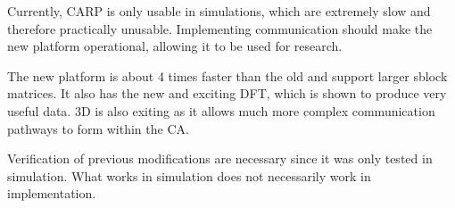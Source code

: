 
Currently, CARP is only usable in simulations, which are extremely slow and therefore practically unusable.
Implementing communication should make the new platform operational, allowing it to be used for research.

The new platform is about 4 times faster than the old and support larger sblock matrices.
It also has the new and exciting DFT, which is shown to produce very useful data.
3D is also exiting as it allows much more complex communication pathways to form within the CA.

Verification of previous modifications are necessary since it was only tested in simulation.
What works in simulation does not necessarily work in implementation.

